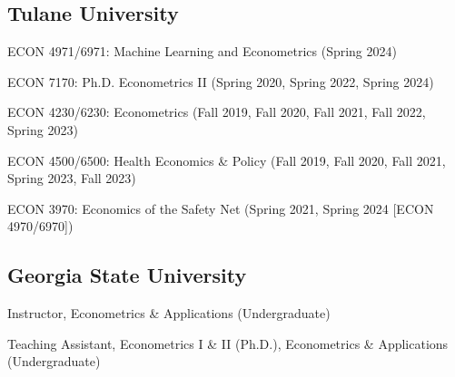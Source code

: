 \documentclass[12pt,letterpaper]{article}
\renewenvironment{itemize}{
	\begin{list}{}{
			\setlength{\leftmargin}{1em}
			\setlength{\itemsep}{0.15em}
			\setlength{\parskip}{0pt}
			\setlength{\parsep}{0.2em}
		}
	}{
	\end{list}
}
\begin{document}
\subsection*{Tulane University}
\begin{itemize}
\item ECON 4971/6971: Machine Learning and Econometrics (Spring 2024)
\item ECON 7170: Ph.D. Econometrics II (Spring 2020, Spring 2022,  Spring 2024)
\item ECON 4230/6230: Econometrics (Fall 2019, Fall 2020, Fall 2021, Fall 2022, Spring 2023)
\item ECON 4500/6500: Health Economics \& Policy (Fall 2019, Fall 2020, Fall 2021, Spring 2023, Fall 2023)
\item ECON 3970: Economics of the Safety Net (Spring 2021, Spring 2024 [ECON 4970/6970])
\end{itemize}

\subsection*{Georgia State University}

\begin{itemize}
	\item Instructor, Econometrics \& Applications (Undergraduate)
	\item Teaching Assistant, Econometrics I \& II (Ph.D.), Econometrics \& Applications (Undergraduate)
\end{itemize}
	
\end{document}
